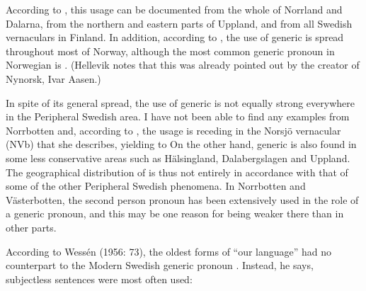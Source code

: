 According to \citet[84]{Westerberg2004}, this usage can be documented from the whole of Norrland and Dalarna, from the northern and eastern parts of Uppland, and from all Swedish vernaculars in Finland. In addition, according to \citet[48]{Hellevik1979}, the use of generic  is spread throughout most of Norway, although the most common generic pronoun in Norwegian is . (Hellevik notes that this was already pointed out by the creator of Nynorsk, Ivar Aasen.)


In spite of its general spread, the use of generic  is not equally strong everywhere in the Peripheral Swedish area. I have not been able to find any examples from Norrbotten and, according to \citet[85]{Westerberg2004}, the usage is receding in the Norsjö vernacular (NVb) that she describes, yielding to On the other hand, generic  is also found in some less conservative areas such as Hälsingland, Dalabergslagen and Uppland. The geographical distribution of  is thus not entirely in accordance with that of some of the other Peripheral Swedish phenomena. In Norrbotten and Västerbotten, the second person pronoun  has been extensively used in the role of a generic pronoun, and this may be one reason for  being weaker there than in other parts. 


According to Wessén (1956: 73), the oldest forms of “our language” had no counterpart to the Modern Swedish generic pronoun . Instead, he says, subjectless sentences were most often used: 


\ea\label{}


